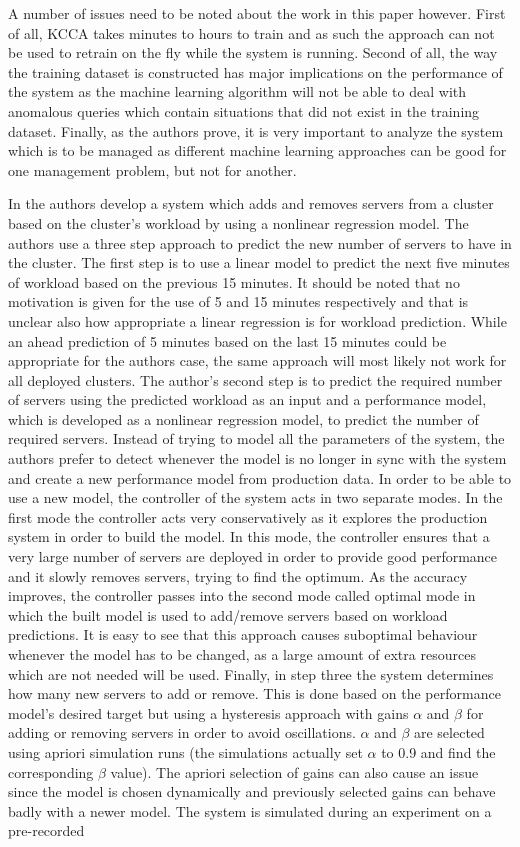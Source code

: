 A number of issues need to be noted about the work in this paper however. First of all, KCCA takes minutes to hours to train and as such the approach can not be used to retrain on the fly while the system is running. Second of all, the way the training dataset is constructed has major implications on the performance of the system as the machine learning algorithm will not be able to deal with anomalous queries which contain situations that did not exist in the training dataset. Finally, as the authors prove, it is very important to analyze the system which is to be managed as different machine learning approaches can be good for one management problem, but not for another.

In \cite{related:mlac} the authors develop a system which adds and removes servers from a cluster based on the cluster's workload by using a nonlinear regression model. The authors use a three step approach to predict the new number of servers to have in the cluster. The first step is to use a linear model to predict the next five minutes of workload based on the previous 15 minutes. It should be noted that no motivation is given for the use of 5 and 15 minutes respectively and that is unclear also how appropriate a linear regression is for workload prediction. While an ahead prediction of 5 minutes based on the last 15 minutes could be appropriate for the authors case, the same approach will most likely not work for all deployed clusters. The author's second step is to predict the required number of servers using the predicted workload as an input and a performance model, which is developed as a nonlinear regression model, to predict the number of required servers. Instead of trying to model all the parameters of the system, the authors prefer to detect whenever the model is no longer in sync with the system and create a new performance model from production data. In order to be able to use a new model, the controller of the system acts in two separate modes. In the first mode the controller acts very conservatively as it explores the production system in order to build the model. In this mode, the controller ensures that a very large number of servers are deployed in order to provide good performance and it slowly removes servers, trying to find the optimum. As the accuracy improves, the controller passes into the second mode called optimal mode in which the built model is used to add/remove servers based on workload predictions. It is easy to see that this approach causes suboptimal behaviour whenever the model has to be changed, as a large amount of extra resources which are not needed will be used. Finally, in step three the system determines how many new servers to add or remove. This is done based on the performance model's desired target but using a hysteresis approach with gains $\alpha$ and $\beta$ for adding or removing servers in order to avoid oscillations. $\alpha$ and $\beta$ are selected using apriori simulation runs (the simulations actually set $\alpha$ to 0.9 and find the corresponding $\beta$ value). The apriori selection of gains can also cause an issue since the model is chosen dynamically and previously selected gains can behave badly with a newer model. The system is simulated during an experiment on a pre-recorded 